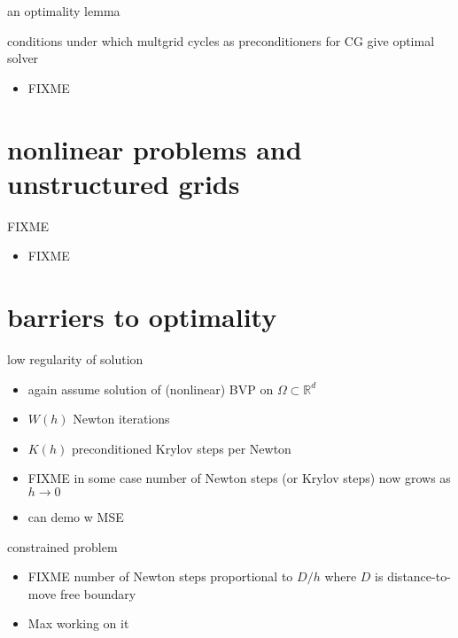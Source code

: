 \documentclass[hide notes,intlimits,usenames,dvipsnames]{beamer}
\newcommand{\RR}{\mathbb{R}}
\begin{document}
\begin{frame}{an optimality lemma}

conditions under which multgrid cycles as preconditioners for CG give optimal solver
\begin{itemize}
\item FIXME
\end{itemize}
\end{frame}


\section{nonlinear problems and unstructured grids}

\begin{frame}{FIXME}
\begin{itemize}
\item FIXME
\end{itemize}
\end{frame}



\section{barriers to optimality}


\begin{frame}{low regularity of solution}
\begin{itemize}
\item again assume solution of (nonlinear) BVP on $\Omega \subset \RR^d$
\item $W(h)$ Newton iterations
\item $K(h)$ preconditioned Krylov steps per Newton
\item FIXME  in some case number of Newton steps (or Krylov steps) now grows as $h\to 0$
\item can demo w MSE
\end{itemize}
\end{frame}


\begin{frame}{constrained problem}
\begin{itemize}
\item FIXME  number of Newton steps proportional to $D/h$ where $D$ is distance-to-move free boundary
\item Max working on it
\end{itemize}
\end{frame}
\end{document}
